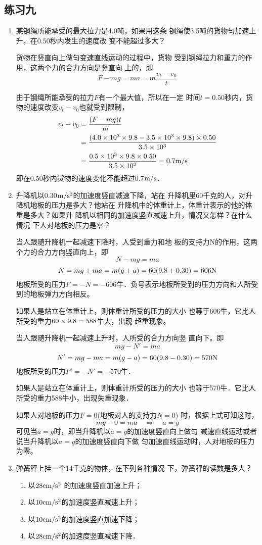 \subsection{练习九}
\begin{enumerate}
\item 某钢绳所能承受的最大拉力是4.0吨，如果用这条
钢绳使3.5吨的货物匀加速上升，在0.50秒内发生的速度改
变不能超过多大？
	 
\begin{solution}
    货物在竖直向上做匀变速直线运动的过程中，货物
受到钢绳拉力和重力的作用，这两个力的合力方向是竖直向
上的，即
\[F-mg=ma=m\frac{v_t-v_0}{t}\]

由于钢绳所能承受的拉力$F$有一个最大值，所以在一定
时间$t=0.50$秒内，货物的速度改变$v_t-v_0$也就受到限制，
\[\begin{split}
    v_t-v_0&= \frac{(F-mg)t}{m}\\
    &=\frac{(4.0\times10^3\times9.8-3.5\times10^3\times9.8)\times0.50}{3.5\times 10^3}\\
    &=\frac{0.5\times10^3\times9.8\times0.50}{3.5\times10^2}=0.7\text{m}/\text{s}
\end{split}\]
即在0.50秒内货物的速度变化不能超过0.7$\text{m}/\text{s}$．
\end{solution}
\item 升降机以0.30$\text{m}/\text{s}^2$的加速度竖直减速下降，站在
升降机里60千克的人，对升降机地板的压力是多大？他站在
升降机中的体重计上，体重计表示的他的体重是多大？如果升
降机以相同的加速度竖直减速上升，情况又怎样？在什么情况
下人对地板的压力是零？
	 
\begin{solution}
    当人跟随升降机一起减速下降时，人受到重力和地
板的支持力N的作用，这两个力的合力方向竖直向上，即
\[N-mg=ma\]
\[N=mg+ma=m(g+a)=60(9.8+0.30)=606{\rm N}\]
地板所受的压力$F=-N=-606$牛．负号表示地板所受到的压力方向和人所受到的地板弹力方向相反。

如果人是站立在体重计上，则体重计所受的压力的大小
也等于606牛，它比人所受的重力$60\times9.8=588$牛大，出现
超重现象。

当人跟随升降机一起减速上升时，人所受的合力方向竖
直向下。即
\[mg-N'=ma\]
\[N'=mg-ma=m(g-a)=60(9.8-0.30)=570{\rm N}\]
地板所受的压力$F'=-N'=-570$牛．

如果人是站立在体重计上，则体重计所受的压力的大小
也等于570牛．它比人所受的重力588牛小，出现失重现象．

如果人对地板的压力$F=0$(地板对人的支持力$N=0$)
时，根据上式可知这时，
\[mg-0=ma\quad \Rightarrow\quad a=g\]
可见当$a=g$时，即当升降机以$a=g$的加速度竖直向上做匀
减速直线运动或者说当升降机以$a=g$的加速度竖直向下做
匀加速直线运动时，人对地板的压力为零。
\end{solution}
\item 弹簧秤上挂一个14千克的物体，在下列各种情况
下，弹簧秤的读数是多大？
\begin{enumerate}
\item 以$28{\rm cm}/{\rm s^2}$ 的加速度竖直加速上升；
\item 以$10{\rm cm}/{\rm s^2}$的加速度竖直减速上升；
\item 以$10{\rm cm}/{\rm s^2}$的加速度竖直加速下降；
\item 以$28{\rm cm}/{\rm s^2}$的加速度竖直减速下降．
\end{enumerate}
	 

\end{enumerate}
